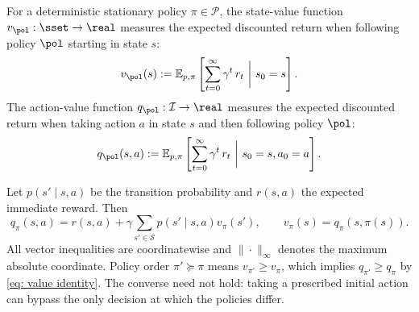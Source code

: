 For a deterministic stationary policy $\pi\in\mathcal P$,
the state-value function $v_\pol : \sset \to \real$ 
measures the expected discounted return when following policy $\pol$ starting in state $s$:
\begin{align*} 
    v_\pol(s)
    :=
    \mathbb E_{p, \pi} \left[ \sum_{t=0}^{\infty} \gamma^t \, r_t  \ \bigg| \ s_0 = s \right] .
\end{align*}
The action-value function $q_\pol : \mathcal I \to \real$ measures the expected discounted return when taking action $a$ in state $s$ and then following policy $\pol$:
\begin{align*} 
    q_\pol(s,a)
    :=
    \mathbb E_{p, \pi} \left[ \sum_{t=0}^{\infty} \gamma^t \, r_t  \ \bigg| \ s_0 = s, a_0 = a \right] .
\end{align*}

Let $p(s'\mid s,a)$ be the transition probability and $r(s,a)$ the expected immediate reward. Then
\begin{equation}\label{eq: value identity}
q_\pi(s,a)=r(s,a)+\gamma\sum_{s'\in\mathcal S}p(s'\mid s,a)v_\pi(s'),
\qquad v_\pi(s)=q_\pi(s,\pi(s)).
\end{equation}
All vector inequalities are coordinatewise and $\|\cdot\|_\infty$ denotes the maximum absolute coordinate. Policy order $\pi'\succeq\pi$ means $v_{\pi'}\ge v_\pi$, which implies $q_{\pi'}\ge q_\pi$ by \eqref{eq: value identity}. The converse need not hold: taking a prescribed initial action can bypass the only decision at which the policies differ.

